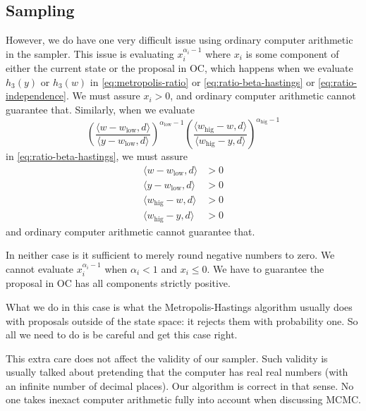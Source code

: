 \documentclass[11pt]{article}
\newcommand{\inner}[1]{\langle #1 \rangle}
\begin{document}
\subsection{Sampling}

However, we do have one very difficult issue using ordinary computer
arithmetic in the sampler.  This issue is evaluating
$x_i^{\alpha_i - 1}$ where $x_i$ is some component of either the
current state or the proposal in OC, which happens when we evaluate
$h_3(y)$ or $h_3(w)$ in \eqref{eq:metropolis-ratio} or
\eqref{eq:ratio-beta-hastings} or \eqref{eq:ratio-independence}.
We must assure $x_i > 0$,
and ordinary computer arithmetic cannot guarantee that.
Similarly, when we evaluate
$$
   \left( \frac{\inner{w - w_\text{low}, d}}{\inner{y - w_\text{low}, d}}
   \right)^{\alpha_\text{low} - 1}
   \left( \frac{\inner{w_\text{hig} - w, d}}{\inner{w_\text{hig} - y, d}}
   \right)^{\alpha_\text{hig} - 1}
$$
in \eqref{eq:ratio-beta-hastings}, we must assure
\begin{align*}
   \inner{w - w_\text{low}, d} & > 0
   \\
   \inner{y - w_\text{low}, d} & > 0
   \\
   \inner{w_\text{hig} - w, d} & > 0
   \\
   \inner{w_\text{hig} - y, d} & > 0
\end{align*}
and ordinary computer arithmetic cannot guarantee that.

In neither case is it sufficient to merely round negative numbers to zero.
We cannot evaluate $x_i^{\alpha_i - 1}$ when $\alpha_i < 1$ and $x_i \le 0$.
We have to guarantee the proposal in OC has all components strictly positive.

What we do in this case is what the Metropolis-Hastings algorithm usually
does with proposals outside of the state space: it rejects them with
probability one.  So all we need to do is be careful and get this case right.

This extra care does not affect the validity of our sampler.  Such validity
is usually talked about pretending that the computer has real real numbers
(with an infinite number of decimal places).  Our algorithm is correct in
that sense.  No one takes inexact computer arithmetic fully into account
when discussing MCMC.
\end{document}
